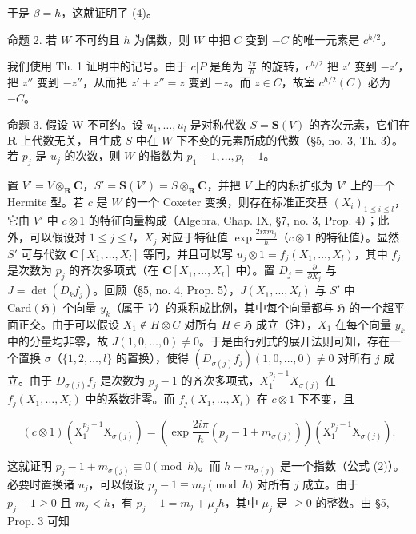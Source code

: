 于是 \(\beta = h\)，这就证明了 (4)。

命题 2. 若 \(W\) 不可约且 \(h\) 为偶数，则 \(W\) 中把 \(C\) 变到 \(-C\) 的唯一元素是 \(c^{h/2}\)。

我们使用 Th. 1 证明中的记号。由于 \(c|P\) 是角为 \(\frac{2\pi}{h}\) 的旋转，\(c^{h/2}\) 把 \(z'\) 变到 \(-z'\)，把 \(z''\) 变到 \(-z''\)，从而把 \(z' + z'' = z\) 变到 \(-z\)。而 \(z \in C\)，故室 \(c^{h/2}(C)\) 必为 \(-C\)。

命题 3. 假设 W 不可约。设 \(u_1, \ldots, u_l\) 是对称代数 \(S = \mathbf{S}(V)\) 的齐次元素，它们在 \(\mathbf{R}\) 上代数无关，且生成 \(S\) 中在 \(W\) 下不变的元素所成的代数（§5, no. 3, Th. 3）。若 \(p_j\) 是 \(u_j\) 的次数，则 \(W\) 的指数为 \(p_1 - 1, \ldots, p_l - 1\)。

置 \(V' = V \otimes_{\mathbf{R}} \mathbf{C}\)，\(S' = \mathbf{S}(V') = S \otimes_{\mathbf{R}} \mathbf{C}\)，并把 \(V\) 上的内积扩张为 \(V'\) 上的一个 Hermite 型。若 \(c\) 是 \(W\) 的一个 Coxeter 变换，则存在标准正交基 \((X_i)_{1 \leqslant i \leqslant l}\)，它由 \(V'\) 中 \(c \otimes 1\) 的特征向量构成（Algebra, Chap. IX, §7, no. 3, Prop. 4）；此外，可以假设对 \(1 \leqslant j \leqslant l\)，\(X_j\) 对应于特征值 \(\exp \frac{2i\pi m_j}{h}\)（\(c \otimes 1\) 的特征值）。显然 \(S'\) 可与代数 \(\mathbf{C}[X_1, \ldots, X_l]\) 等同，并且可以写 \(u_j \otimes 1 = f_j(X_1, \ldots, X_l)\)，其中 \(f_j\) 是次数为 \(p_j\) 的齐次多项式（在 \(\mathbf{C}[X_1, \ldots, X_l]\) 中）。置 \(D_j = \frac{\partial}{\partial X_j}\) 与 \(J = \det(D_k f_j)\)。回顾（§5, no. 4, Prop. 5），\(J(X_1, \ldots, X_l)\) 与 \(S'\) 中 \(\text{Card}(\mathfrak{H})\) 个向量 \(y_k\)（属于 \(V\)）的乘积成比例，其中每个向量都与 \(\mathfrak{H}\) 的一个超平面正交。由于可以假设 \(X_1 \notin H \otimes C\) 对所有 \(H \in \mathfrak{H}\) 成立（注），\(X_1\) 在每个向量 \(y_k\) 中的分量均非零，故 \(J(1, 0, \ldots, 0) \neq 0\)。于是由行列式的展开法则可知，存在一个置换 \(\sigma\)（\(\{1, 2, \ldots, l\}\) 的置换），使得 \((D_{\sigma(j)} f_j)(1, 0, \ldots, 0) \neq 0\) 对所有 \(j\) 成立。由于 \(D_{\sigma(j)} f_j\) 是次数为 \(p_j - 1\) 的齐次多项式，\(X_1^{p_j - 1} X_{\sigma(j)}\) 在 \(f_j(X_1, \ldots, X_l)\) 中的系数非零。而 \(f_j(X_1, \ldots, X_l)\) 在 \(c \otimes 1\) 下不变，且

\[
(c \otimes 1) (\mathrm{X} _ {1} ^ {p _ {j} - 1} \mathrm{X} _ {\sigma (j)}) = \left(\exp \frac {2 i \pi}{h} (p _ {j} - 1 + m _ {\sigma (j)})\right) (\mathrm{X} _ {1} ^ {p _ {j} - 1} \mathrm{X} _ {\sigma (j)}).
\]

这就证明 \(p_j - 1 + m_{\sigma(j)} \equiv 0 \pmod{h}\)。而 \(h - m_{\sigma(j)}\) 是一个指数（公式 (2)）。必要时置换诸 \(u_j\)，可以假设 \(p_j - 1 \equiv m_j \pmod{h}\) 对所有 \(j\) 成立。由于 \(p_j - 1 \geqslant 0\) 且 \(m_j < h\)，有 \(p_j - 1 = m_j + \mu_j h\)，其中 \(\mu_j\) 是 \(\geqslant 0\) 的整数。由 §5, Prop. 3 可知

